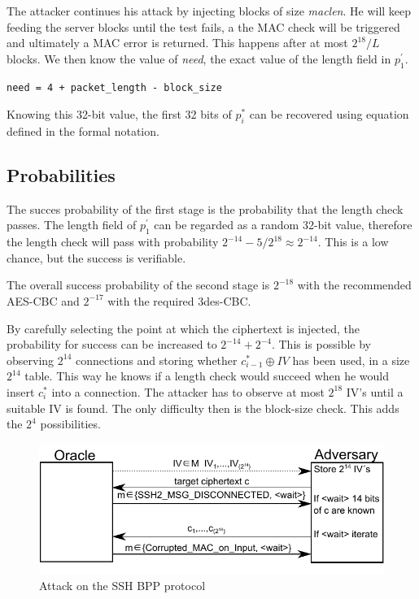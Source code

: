 \documentclass[twocolumn]{article}
\newcommand{\xor}{\oplus}
\begin{document}
\indent The attacker continues his attack by injecting blocks of size \emph{maclen}. He will keep feeding the server blocks until the test fails, a the MAC check will be triggered and ultimately a MAC error is returned. This happens after at most $2^{18}/L$ blocks. We then know the value of \emph{need}, the exact value of the length field in $p_1^{'}$.
\begin{verbatim}
need = 4 + packet_length - block_size
\end{verbatim}
\indent Knowing this 32-bit value, the first 32 bits of $p^*_i$ can be recovered using equation defined in the formal notation.

\subsection*{Probabilities}

\indent The succes probability of the first stage is the probability that the length check passes.
The length field of $p^{'}_1$ can be regarded as a random 32-bit value, therefore the length check will pass with probability $2^{-14} - 5/2^{18} \approx 2^{-14}$. This is a low chance, but the success is verifiable.

\indent The overall success probability of the second stage is $2^{-18}$ with the recommended AES-CBC and $2^{-17}$ with the required 3des-CBC.

\indent By carefully selecting the point at which the ciphertext is injected, the probability for success can be increased to $2^{-14}+2^{-4}$. This is possible by observing $2^14$ connections and storing whether $c^*_{i-1} \xor IV$ has been used, in a size $2^{14}$ table. This way he knows if a length check would succeed when he would insert $c_i^*$ into a connection. The attacker has to observe at most $2^{18}$ IV's until a suitable IV is found. The only difficulty then is the block-size check. This adds the $2^{4}$ possibilities.

\begin{figure}
	  \centering
    	\includegraphics[scale=1]{drawing.pdf}
	\caption{Attack on the SSH BPP protocol~\cite{Albrecht2009}}
	\label{fig:BPPAttack}
\end{figure}
\end{document}
